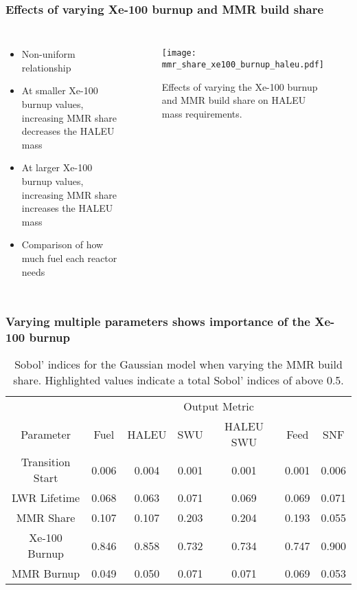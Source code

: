 \begin{frame}
    \frametitle{Effects of varying Xe-100 burnup and MMR build share}
    \begin{columns}

        \column[t]{4cm}
        \begin{itemize}
            \item Non-uniform relationship
            \item At smaller Xe-100 burnup values, increasing MMR 
                  share decreases the HALEU mass
            \item At larger Xe-100 burnup values, increasing MMR share 
                  increases the HALEU mass
            \item Comparison of how much fuel each reactor needs
        \end{itemize}

    \column[t]{6cm}
    \vspace{-1cm}
    \begin{figure}
        \centering 
            \texttt{[image: mmr\_share\_xe100\_burnup\_haleu.pdf]}
            \caption{Effects of varying the Xe-100 burnup and MMR build 
            share on HALEU mass requirements. }
            \label{fig:mmr_share_xe100_bu}
    \end{figure}

\end{columns}
\end{frame}

\begin{frame}
    \frametitle{Varying multiple parameters shows importance of the 
    Xe-100 burnup}
    \begin{table}[h!]
        \centering
        \caption{Sobol' indices for the Gaussian model when varying the MMR 
        build share. Highlighted 
        values indicate a total Sobol' indices of above 0.5.}
        \label{tab:s7_sobol_mmr_gaussian}
        \begin{tabular}{c c c c c c c }
            \hline
            & \multicolumn{6}{c}{Output Metric} \\
            Parameter & Fuel & HALEU & SWU & HALEU SWU & Feed & SNF\\
            \hline
            Transition Start & 0.006 & 0.004 & 0.001 &
                               0.001 & 0.001 & 0.006\\
            LWR Lifetime & 0.068 & 0.063 & 0.071 &
                           0.069 & 0.069 & 0.071\\
            MMR Share & 0.107 & 0.107 & 0.203 &
                              0.204 & 0.193 & 0.055\\
            Xe-100 Burnup & \cellcolor{green!25}0.846 & \cellcolor{green!25}0.858 & \cellcolor{green!25}0.732 &
            \cellcolor{green!25}0.734 & \cellcolor{green!25}0.747 & \cellcolor{green!25}0.900\\
            MMR Burnup & 0.049 & 0.050 & 0.071 &
                         0.071 & 0.069 & 0.053\\
            \hline        
        \end{tabular}
    \end{table}
\end{frame}

